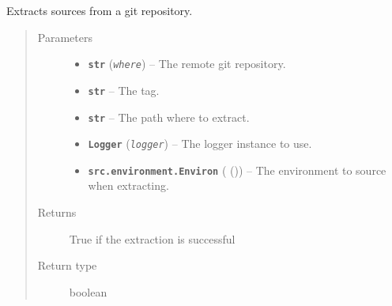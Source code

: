 \documentclass[a4paper,10pt,english]{sphinxmanual}
\begin{document}

\begin{fulllineitems}
\label{commands/apidoc/src:src.system.git_extract}
Extracts sources from a git repository.
\begin{quote}\begin{description}
\item[{Parameters}] \leavevmode\begin{itemize}
\item {} 
\textbf{\texttt{str}} (\emph{\texttt{where}}) -- The remote git repository.

\item {} 
\textbf{\texttt{str}} -- The tag.

\item {} 
\textbf{\texttt{str}} -- The path where to extract.

\item {} 
\textbf{\texttt{Logger}} (\emph{\texttt{logger}}) -- The logger instance to use.

\item {} 
\textbf{\texttt{src.environment.Environ}} ({\hyperref[commands/apidoc/src:module\string-src.environment]{}} ()) -- The environment to source when
extracting.

\end{itemize}

\item[{Returns}] \leavevmode
True if the extraction is successful

\item[{Return type}] \leavevmode
boolean

\end{description}\end{quote}

\end{fulllineitems}

\end{document}
